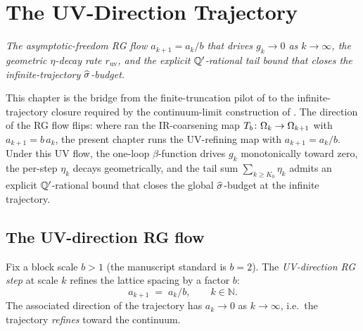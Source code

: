 %

\chapter{The UV-Direction Trajectory}
\label{ch:uv-trajectory}

\noindent\emph{The asymptotic-freedom RG flow $a_{k+1} = a_k / b$
that drives $g_k \to 0$ as $k \to \infty$, the geometric
$\eta$-decay rate $r_{\mathrm{uv}}$, and the explicit $\mathbb{Q}'$-rational
tail bound that closes the infinite-trajectory $\widehat{\sigma}$-budget.}

This chapter is the bridge from the finite-truncation pilot of
 to the infinite-trajectory closure required by
the continuum-limit construction of .  The
direction of the RG flow flips: where 
ran the IR-coarsening map $T_b \colon \Omega_k \to \Omega_{k+1}$ with
$a_{k+1} = b\,a_k$, the present chapter runs the UV-refining map
with $a_{k+1} = a_k / b$.  Under this UV flow, the one-loop
$\beta$-function drives $g_k$ monotonically toward zero, the per-step
$\eta_k$ decays geometrically, and the tail sum
$\sum_{k \ge K_0} \eta_k$ admits an explicit $\mathbb{Q}'$-rational bound
that closes the global $\widehat{\sigma}$-budget at the infinite trajectory.

\section{The UV-direction RG flow}
\label{sec:uv-direction-flow}

%

\begin{convention}
\label{conv:uv-step}
Fix a block scale $b > 1$ (the manuscript standard is $b = 2$).
The \emph{UV-direction RG step} at scale $k$ refines the lattice
spacing by a factor $b$:
\begin{equation}
  \label{eq:uv-spacing}
  a_{k+1} \;=\; a_k / b ,
  \qquad k \in \mathbb{N}.
\end{equation}
The associated direction of the trajectory has $a_k \to 0$ as $k \to
\infty$, i.e.\ the trajectory \emph{refines} toward the continuum.
\end{convention}

